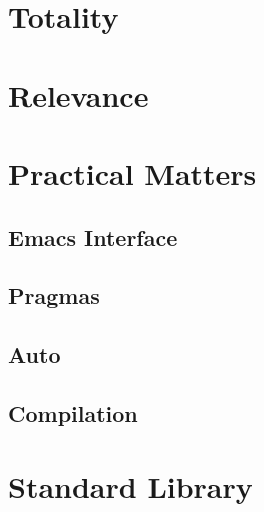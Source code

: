 \documentclass{article}
\begin{document}
\section{Totality}
\section{Relevance}
\section{Practical Matters}
\subsection{Emacs Interface}
\subsection{Pragmas}
\subsection{Auto}
\subsection{Compilation}
\section{Standard Library}
\end{document}
